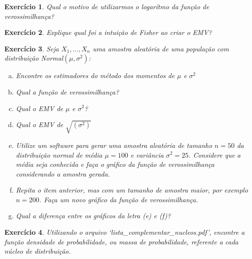 \documentclass[letter,11pt]{article}
\newtheorem{exer}{Exercício}
\begin{document}
\medskip
\begin{exer} \rm
\item Qual o motivo de utilizarmos o logarítmo da função de verossimilhança?
\end{exer}


\medskip
\begin{exer} \rm
\item Explique qual foi a intuição de Fisher ao criar o EMV?
\end{exer}


\medskip
\begin{exer} \rm
Seja $X_1, \ldots, X_n$ uma amostra aleatória de uma população com distribuição Normal$(\mu, \sigma^2)$:
\begin{enumerate}[a)]
  \item Encontre os estimadores do método dos momentos de $\mu$ e $\sigma^2$
  \item Qual a função de verossimilhança?
  \item Qual o EMV de $\mu$ e $\sigma^2$?
  \item Qual o EMV de $\sqrt{(\sigma^2)}$
  \item Utilize um software para gerar uma amostra aleatória de tamanho $n=50$ da distribuição normal de média $\mu=100$ e variância $\sigma^2=25$. Considere que a média seja conhecida e faça o gráfico da função de verossimilhança considerando a amostra gerada. 
  \item Repita o item anterior, mas com um tamanho de amostra maior, por exemplo $n=200$. Faça um novo gráfico da função de verossimilhança. 
  \item Qual a diferença entre os gráficos da letra (e) e (f)?
\end{enumerate}
\end{exer}


\medskip
\begin{exer} \rm
Utilizando o arquivo `lista\_complementar\_nucleos.pdf', encontre a função densidade de probabilidade, ou massa de probabilidade, referente a cada núcleo de distribuição. 
\end{exer}
\end{document}
